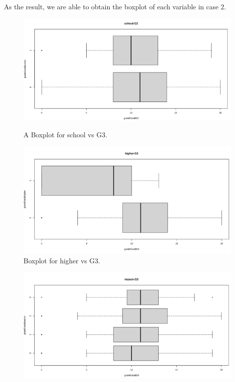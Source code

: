 \documentclass[a4paper]{article}
\begin{document}
\begin{enumerate}
\begin{figure}[H]
        \label{fig:boxplot11}
    \end{figure}
    As the result, we are able to obtain the boxplot of each variable in case 2.
    \begin{figure}[H]
        \centering
        \begin{minipage}{0.5\textwidth}
            \centering
            \includegraphics[width = 1\linewidth]{Images/32.PNG}
            \caption{A Boxplot for school vs G3.}
            \label{fig:boxplot12}
        \end{minipage}%
        \begin{minipage}{0.5\textwidth}
            \centering
            \includegraphics[width = 1\linewidth]{Images/33.PNG}
            \caption{Boxplot for higher vs G3.}
            \label{fig:boxplot13}
        \end{minipage}
    \end{figure}
    \begin{figure}[H]
        \centering
        \begin{minipage}{0.5\textwidth}
            \centering
            \includegraphics[width = 1\linewidth]{Images/34.PNG}

\end{minipage}
\end{figure}
\end{enumerate}
\end{document}
